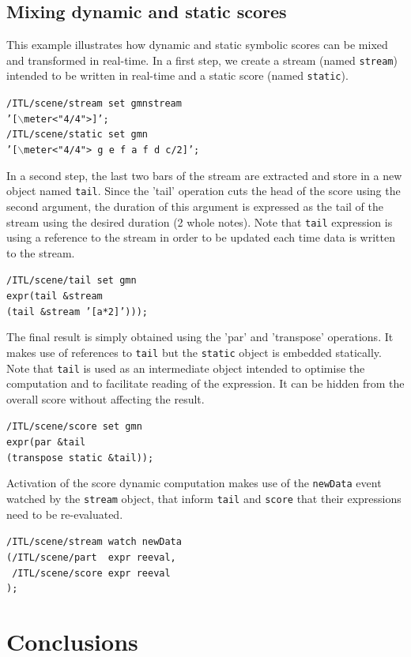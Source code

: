 \documentclass{article}
\newcommand{\OSC}[1]{{\fontsize{10pt}{10pt} \selectfont\texttt{#1}}}
\newcommand{\tab}{\hspace*{4mm}}
\newcommand{\sample}	[1]			{\vspace{-0.2em}\begin{center}\colorbox{mygrey}{\begin{minipage}[t]{0.95\columnwidth} {\small \texttt{#1}}\end{minipage}}\end{center}}
\begin{document}
\subsection{Mixing dynamic and static scores}\label{sample3}
This example illustrates how dynamic and static symbolic scores can be mixed and transformed in real-time.
In a first step, we create a stream (named \OSC{stream}) intended to be written in real-time and a static score (named \OSC{static}).
\sample{/ITL/scene/stream set gmnstream \\
\tab \tab '[$\backslash$meter<"4/4">]';\\
/ITL/scene/static set gmn \\
\tab \tab '[$\backslash$meter<"4/4"> g e f a f d c/2]';
}
In a second step, the last two bars of the stream are extracted and store in a new object named \OSC{tail}. Since the 'tail' operation cuts the head of the score using the second argument, the duration of this argument is expressed as the tail of the stream using the desired duration (2 whole notes). 
Note that \OSC{tail} expression is using a reference to the stream in order to be updated each time data is written to the stream.
\sample{/ITL/scene/tail set gmn \\
\tab \tab expr(tail \&stream \\
\tab \tab \tab \tab (tail \&stream '[a*2]')));
}
The final result is simply obtained using the 'par' and 'transpose' operations. It makes use of references to \OSC{tail} but the \OSC{static} object is embedded statically. Note that \OSC{tail} is used as an intermediate object intended to optimise the computation and to facilitate reading of the expression. It can be hidden from the overall score without affecting the result.
\sample{/ITL/scene/score set gmn \\
\tab \tab expr(par \&tail \\
\tab \tab \tab \tab (transpose static \&tail));
}
Activation of the score dynamic computation makes use of the \OSC{newData} event watched by the \OSC{stream} object, that inform \OSC{tail} and \OSC{score} that their expressions need to be re-evaluated.
\sample{/ITL/scene/stream watch newData \\
\tab \tab (/ITL/scene/part \ expr reeval, \\
\tab \tab \ /ITL/scene/score expr reeval \\
\tab \tab );
}

\section{Conclusions}
\end{document}
